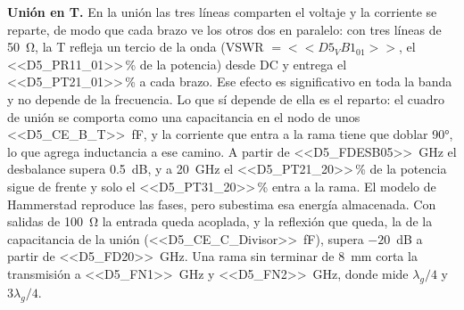 \documentclass[11pt,letterpaper]{article}
\begin{document}
\begin{resultado}
\textbf{Unión en T.} En la unión las tres líneas comparten el voltaje y la corriente se reparte, de modo que cada brazo ve los otros dos en paralelo: con tres líneas de \SI{50}{\ohm}, la T refleja un tercio de la onda (VSWR $=<<D5_VB1_01>>$, el <<D5_PR11_01>>\,\% de la potencia) desde DC y entrega el <<D5_PT21_01>>\,\% a cada brazo. Ese efecto es significativo en toda la banda y no depende de la frecuencia. Lo que sí depende de ella es el reparto: el cuadro de unión se comporta como una capacitancia en el nodo de unos \SI{<<D5_CE_B_T>>}{fF}, y la corriente que entra a la rama tiene que doblar \ang{90}, lo que agrega inductancia a ese camino. A partir de \SI{<<D5_FDESB05>>}{GHz} el desbalance supera \SI{0.5}{dB}, y a \SI{20}{GHz} el <<D5_PT21_20>>\,\% de la potencia sigue de frente y solo el <<D5_PT31_20>>\,\% entra a la rama. El modelo de Hammerstad reproduce las fases, pero subestima esa energía almacenada. Con salidas de \SI{100}{\ohm} la entrada queda acoplada, y la reflexión que queda, la de la capacitancia de la unión (\SI{<<D5_CE_C_Divisor>>}{fF}), supera $-20$~dB a partir de \SI{<<D5_FD20>>}{GHz}. Una rama sin terminar de \SI{8}{mm} corta la transmisión a \SI{<<D5_FN1>>}{GHz} y \SI{<<D5_FN2>>}{GHz}, donde mide $\lambda_g/4$ y $3\lambda_g/4$.
\end{resultado}
\end{document}
